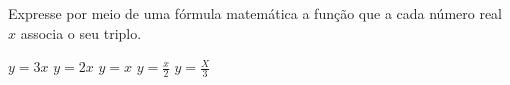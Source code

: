 Expresse por meio de uma fórmula matemática a função que a cada número real $x$ associa o seu triplo.

$y=3x$
$y=2x$
$y=x$
$y=\frac{x}{2}$
$y=\frac{X}{3}$


